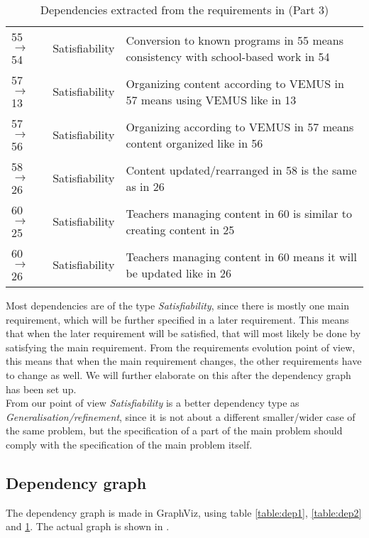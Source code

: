 \documentclass[a4paper,11pt]{article}
\begin{document}
\begin{table}[h!]
\begin{tabular}{l | l | p{10cm}}
					55 $\rightarrow$ 54 & Satisfiability & Conversion to known programs in 55 means consistency with school-based work in 54 \\
					57 $\rightarrow$ 13 & Satisfiability & Organizing content according to VEMUS in 57 means using VEMUS like in 13 \\
					57 $\rightarrow$ 56 & Satisfiability & Organizing  according to VEMUS in 57 means content organized like in 56 \\
					58 $\rightarrow$ 26 & Satisfiability & Content updated/rearranged in 58 is the same as in 26 \\
					60 $\rightarrow$ 25 & Satisfiability & Teachers managing content in 60 is similar to creating content in 25\\
					60 $\rightarrow$ 26 & Satisfiability & Teachers managing content in 60 means it will be updated like in 26 \\
				\end{tabular}
				\caption{Dependencies extracted from the requirements in \cite{VEMUS} (Part 3)}
				\label{table:dep3}
			\end{table}

			Most dependencies are of the type \textit{Satisfiability}, since there is mostly one main requirement, which will be further specified in a later requirement. This means that when the later requirement will be satisfied, that will most likely be done by satisfying the main requirement. From the requirements evolution point of view, this means that when the main requirement changes, the other requirements have to change as well. We will further elaborate on this after the dependency graph has been set up. \\
			From our point of view \textit{Satisfiability} is a better dependency type as \textit{Generalisation/refinement}, since it is not about a different smaller/wider case of the same problem, but the specification of a part of the main problem should comply with the specification of the main problem itself.

		\subsection{Dependency graph}
		The dependency graph is made in GraphViz, using table \ref{table:dep1}, \ref{table:dep2} and \ref{table:dep3}. The actual graph is shown in .
\end{document}
